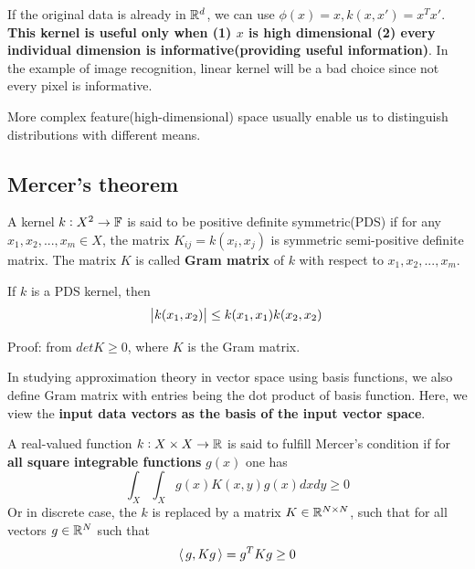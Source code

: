 \begin{refsection}
\begin{example}
	\cite[484]{murphy2012machine} If the original data is already in $\mathbb{R}^d$, we can use $\phi(x) = x,k(x,x')= x^Tx'$. \textbf{This kernel is useful only when (1) $x$ is high dimensional (2) every individual dimension is informative(providing useful information)}. In the example of image recognition, linear kernel will be a bad choice since not every pixel is informative.  
\end{example}


\begin{remark}
	More complex feature(high-dimensional) space usually enable us to distinguish distributions with different means.
\end{remark}





\subsection{Mercer's theorem}

\begin{definition}
	\cite[92]{mohri2012foundations}\cite[30]{scholkopf2002learning}A kernel $k:X^2\to \mathbb{F}$ is said to be positive definite symmetric(PDS) if for any $x_1,x_2,...,x_m \in X$, the matrix $K_{ij} = k(x_i,x_j)$ is symmetric semi-positive definite matrix. The matrix $K$ is called \textbf{Gram matrix} of $k$ with respect to $x_1,x_2,...,x_m$.
\end{definition}

\begin{lemma}
	If $k$ is a PDS kernel, then
	$$\abs{k(x_1,x_2)} \leq k(x_1,x_1)k(x_2,x_2)$$
\end{lemma}
Proof: from $det K \geq 0$, where $K$ is the Gram matrix.


\begin{remark}[interpretation]
	In studying approximation theory in vector space using basis functions, we also define Gram matrix with entries being the dot product of basis function. Here, we view the \textbf{input data vectors as the basis of the input vector space}.
\end{remark}


\begin{definition}
	A real-valued function $k:X\times X \to \mathbb{R}$ is said to fulfill Mercer's condition if for \textbf{all square integrable functions} $g(x)$ one has
	$$\int_X\int_X g(x)K(x,y)g(x) dxdy \geq 0$$
	Or in discrete case, the $k$ is replaced by a matrix $K\in \mathbb{R}^{N\times N}$, such that for all vectors $g\in \mathbb{R}^N$ such that
	$${\left< \, g,Kg \, \right>} = g^T K g \geq 0$$
\end{definition}



\end{refsection}
